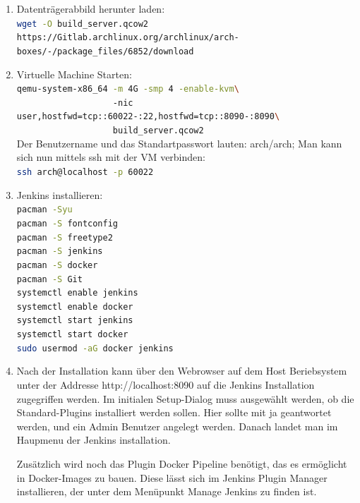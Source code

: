 \begin{enumerate}
    \item Datenträgerabbild herunter laden:\\
        \lstinline[language=sh]!wget -O build_server.qcow2 https://Gitlab.archlinux.org/archlinux/arch-boxes/-/package_files/6852/download!
    \item Virtuelle Machine Starten:\\
    \lstinline[language=sh]!qemu-system-x86_64 -m 4G -smp 4 -enable-kvm\! \\
    \lstinline[language=sh]!                   -nic user,hostfwd=tcp::60022-:22,hostfwd=tcp::8090-:8090\ !\\
    \lstinline[language=sh]!                   build_server.qcow2!\\
    Der Benutzername und das Standartpasswort lauten: arch/arch; Man kann sich nun mittels ssh mit der \ac{VM} verbinden:\\
    \lstinline[language=sh]!ssh arch@localhost -p 60022!\\
    \item Jenkins installieren:\\
    \lstinline[language=sh]!pacman -Syu !\\
    \lstinline[language=sh]!pacman -S fontconfig!\\
    \lstinline[language=sh]!pacman -S freetype2!\\
    \lstinline[language=sh]!pacman -S jenkins!\\
    \lstinline[language=sh]!pacman -S docker!\\
    \lstinline[language=sh]!pacman -S Git!\\
    \lstinline[language=sh]!systemctl enable jenkins!\\
    \lstinline[language=sh]!systemctl enable docker!\\
    \lstinline[language=sh]!systemctl start jenkins!\\
    \lstinline[language=sh]!systemctl start docker!\\
    \lstinline[language=sh]!sudo usermod -aG docker jenkins!\\
    \item Nach der Installation kann über den Webrowser auf dem Host Beriebsystem unter der Addresse http://localhost:8090 auf die Jenkins Installation zugegriffen werden. Im initialen Setup-Dialog muss ausgewählt werden, ob die Standard-Plugins installiert werden sollen. Hier sollte mit ja geantwortet werden, und ein Admin Benutzer angelegt werden. Danach landet man im Haupmenu der Jenkins installation.

Zusätzlich wird noch das Plugin \glqq Docker Pipeline\grqq{} benötigt, das es ermöglicht in Docker-Images zu bauen. Diese lässt sich im Jenkins Plugin Manager installieren, der unter dem Menüpunkt \glqq Manage Jenkins \grqq{} zu finden ist.
\end{enumerate}

